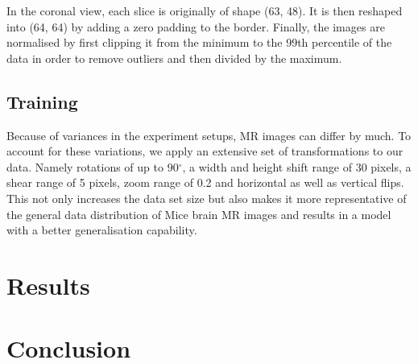 \documentclass{article}
\begin{document}
In the coronal view, each slice is originally of shape (63, 48). It is then reshaped into (64, 64) by adding a zero padding to the border. Finally, the images are normalised by first clipping it from the minimum to the 99th percentile of the data in order to remove outliers and then divided by the maximum.

\subsection{Training}

Because of variances in the experiment setups, MR images can differ by much. To account for these variations, we apply an extensive set of transformations to our data. Namely rotations of up to 90$^{\circ}$, a width and height shift range of 30 pixels, a shear range of 5 pixels, zoom range of 0.2 and horizontal as well as vertical flips. This not only increases the data set size but also makes it more representative of the general data distribution of Mice brain MR images and results in a model with a better generalisation capability.
  
\section{Results}

\section{Conclusion}


  

\end{document}

